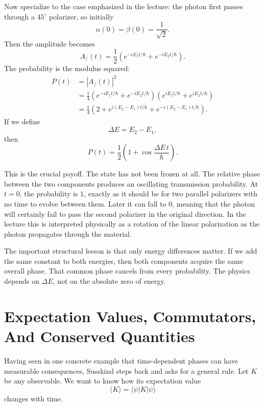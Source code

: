 Now specialize to the case emphasized in the lecture: the photon first passes through a $45^\circ$ polarizer, so initially
\begin{equation}
\alpha(0)=\beta(0)=\frac{1}{\sqrt2}.
\end{equation}
Then the amplitude becomes
\begin{equation}
A_{/}(t)
=
\frac12
\left(
e^{-iE_1 t/\hbar}
+
e^{-iE_2 t/\hbar}
\right).
\end{equation}
The probability is the modulus squared:
\begin{align}
P(t)
&=|A_{/}(t)|^2 \\
&=\frac14
\left(
e^{-iE_1 t/\hbar}+e^{-iE_2 t/\hbar}
\right)
\left(
e^{iE_1 t/\hbar}+e^{iE_2 t/\hbar}
\right) \\
&=\frac14
\left(
2+e^{i(E_2-E_1)t/\hbar}+e^{-i(E_2-E_1)t/\hbar}
\right).
\end{align}
If we define
\begin{equation}
\Delta E=E_2-E_1,
\end{equation}
then
\begin{equation}
P(t)=\frac12\left(1+\cos\frac{\Delta E\,t}{\hbar}\right).
\end{equation}

This is the crucial payoff. The state has not been frozen at all. The relative phase between the two components produces an oscillating transmission probability. At $t=0$, the probability is $1$, exactly as it should be for two parallel polarizers with no time to evolve between them. Later it can fall to $0$, meaning that the photon will certainly fail to pass the second polarizer in the original direction. In the lecture this is interpreted physically as a rotation of the linear polarization as the photon propagates through the material.

The important structural lesson is that only energy differences matter. If we add the same constant to both energies, then both components acquire the same overall phase. That common phase cancels from every probability. The physics depends on $\Delta E$, not on the absolute zero of energy.

\section{Expectation Values, Commutators, And Conserved Quantities}

Having seen in one concrete example that time-dependent phases can have measurable consequences, Susskind steps back and asks for a general rule. Let $K$ be any observable. We want to know how its expectation value
\begin{equation}
\langle K\rangle=\langle\psi|K|\psi\rangle
\end{equation}
changes with time.

